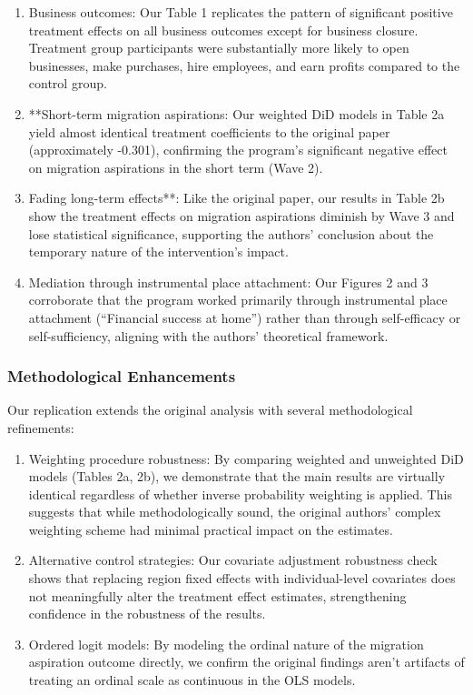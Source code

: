 \documentclass[
]{article}
\begin{document}
\begin{enumerate}
\def\labelenumi{\arabic{enumi}.}
\item
  Business outcomes: Our Table 1 replicates the pattern of significant
  positive treatment effects on all business outcomes except for
  business closure. Treatment group participants were substantially more
  likely to open businesses, make purchases, hire employees, and earn
  profits compared to the control group.
\item
  **Short-term migration aspirations: Our weighted DiD models in Table
  2a yield almost identical treatment coefficients to the original paper
  (approximately -0.301), confirming the program's significant negative
  effect on migration aspirations in the short term (Wave 2).
\item
  Fading long-term effects**: Like the original paper, our results in
  Table 2b show the treatment effects on migration aspirations diminish
  by Wave 3 and lose statistical significance, supporting the authors'
  conclusion about the temporary nature of the intervention's impact.
\item
  Mediation through instrumental place attachment: Our Figures 2 and 3
  corroborate that the program worked primarily through instrumental
  place attachment (``Financial success at home'') rather than through
  self-efficacy or self-sufficiency, aligning with the authors'
  theoretical framework.
\end{enumerate}

\subsubsection{Methodological
Enhancements}\label{methodological-enhancements}

Our replication extends the original analysis with several
methodological refinements:

\begin{enumerate}
\def\labelenumi{\arabic{enumi}.}
\item
  Weighting procedure robustness: By comparing weighted and unweighted
  DiD models (Tables 2a, 2b), we demonstrate that the main results are
  virtually identical regardless of whether inverse probability
  weighting is applied. This suggests that while methodologically sound,
  the original authors' complex weighting scheme had minimal practical
  impact on the estimates.
\item
  Alternative control strategies: Our covariate adjustment robustness
  check shows that replacing region fixed effects with individual-level
  covariates does not meaningfully alter the treatment effect estimates,
  strengthening confidence in the robustness of the results.
\item
  Ordered logit models: By modeling the ordinal nature of the migration
  aspiration outcome directly, we confirm the original findings aren't
  artifacts of treating an ordinal scale as continuous in the OLS
  models.
\end{enumerate}
\end{document}
